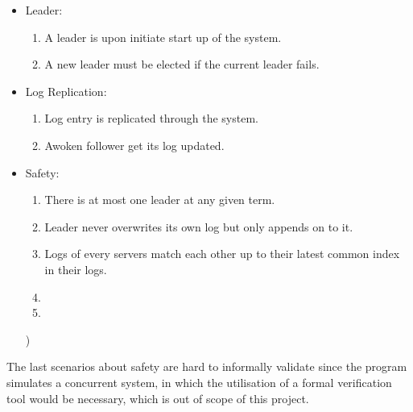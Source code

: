 \begin{itemize}
\item Leader:
    \begin{enumerate}
    \item A leader is upon initiate start up of the system.
    \item A new leader must be elected if the current leader fails.
    \end{enumerate}
\item Log Replication:
    \begin{enumerate}
    \item Log entry is replicated through the system.
    \item Awoken follower get its log updated.
    \end{enumerate}
\item Safety:
    \begin{enumerate}
    \item There is at most one leader at any given term.
    \item Leader never overwrites its own log but only appends on to it.
    \item Logs of every servers match each other up to their latest common index in their logs.
    \item 
    \item 
    \end{enumerate})
\end{itemize}

The last scenarios about safety are hard to informally validate since the program simulates a concurrent system, in which the utilisation of a formal verification tool would be necessary, which is out of scope of this project. %

    
